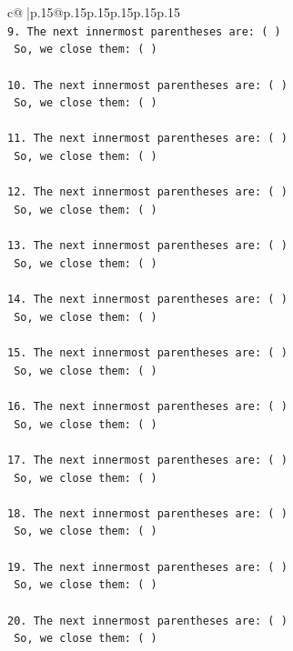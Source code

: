 \documentclass{article}
\begin{document}
{\begin{supertabular}{c@{$\;$}|p{.15\linewidth}@{}p{.15\linewidth}p{.15\linewidth}p{.15\linewidth}p{.15\linewidth}p{.15\linewidth}}
{{{\\ 
\texttt{9. The next innermost parentheses are: ( ) } \\
\texttt{   So, we close them: ( ) } \\
\\ 
\texttt{10. The next innermost parentheses are: ( ) } \\
\texttt{    So, we close them: ( ) } \\
\\ 
\texttt{11. The next innermost parentheses are: ( ) } \\
\texttt{    So, we close them: ( ) } \\
\\ 
\texttt{12. The next innermost parentheses are: ( ) } \\
\texttt{    So, we close them: ( ) } \\
\\ 
\texttt{13. The next innermost parentheses are: ( ) } \\
\texttt{    So, we close them: ( ) } \\
\\ 
\texttt{14. The next innermost parentheses are: ( ) } \\
\texttt{    So, we close them: ( ) } \\
\\ 
\texttt{15. The next innermost parentheses are: ( ) } \\
\texttt{    So, we close them: ( ) } \\
\\ 
\texttt{16. The next innermost parentheses are: ( ) } \\
\texttt{    So, we close them: ( ) } \\
\\ 
\texttt{17. The next innermost parentheses are: ( ) } \\
\texttt{    So, we close them: ( ) } \\
\\ 
\texttt{18. The next innermost parentheses are: ( ) } \\
\texttt{    So, we close them: ( ) } \\
\\ 
\texttt{19. The next innermost parentheses are: ( ) } \\
\texttt{    So, we close them: ( ) } \\
\\ 
\texttt{20. The next innermost parentheses are: ( ) } \\
\texttt{    So, we close them: ( ) } \\
}}}
\end{supertabular}}
\end{document}
